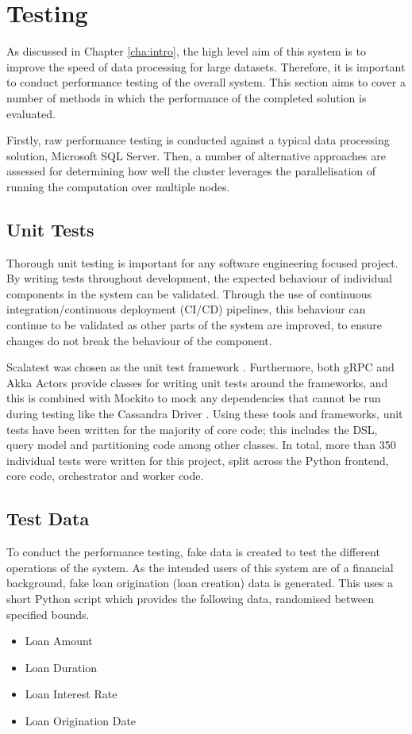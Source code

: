 \chapter{Testing}\label{cha:testing}


As discussed in Chapter \ref{cha:intro}, the high level aim of this system is to improve the speed of data processing for large datasets. Therefore, it is important to conduct performance testing of the overall system. This section aims to cover a number of methods in which the performance of the completed solution is evaluated.

Firstly, raw performance testing is conducted against a typical data processing solution, Microsoft SQL Server. Then, a number of alternative approaches are assessed for determining how well the cluster leverages the parallelisation of running the computation over multiple nodes.

\section{Unit Tests}
Thorough unit testing is important for any software engineering focused project. By writing tests throughout development, the expected behaviour of individual components in the system can be validated. Through the use of continuous integration/continuous deployment (CI/CD) pipelines, this behaviour can continue to be validated as other parts of the system are improved, to ensure changes do not break the behaviour of the component. 

Scalatest was chosen as the unit test framework \cite{scalatestuserguide}. Furthermore, both gRPC and Akka Actors provide classes for writing unit tests around the frameworks, and this is combined with Mockito to mock any dependencies that cannot be run during testing like the Cassandra Driver \cite{scalatestplusmockito, datastaxjavadriver}. Using these tools and frameworks, unit tests have been written for the majority of core code; this includes the DSL, query model and partitioning code among other classes. In total, more than 350 individual tests were written for this project, split across the Python frontend, core code, orchestrator and worker code.

\section{Test Data}
To conduct the performance testing, fake data is created to test the different operations of the system. As the intended users of this system are of a financial background, fake loan origination (loan creation) data is generated. This uses a short Python script which provides the following data, randomised between specified bounds.
\begin{itemize}
	\item Loan Amount
	\item Loan Duration
	\item Loan Interest Rate
	\item Loan Origination Date
\end{itemize}

